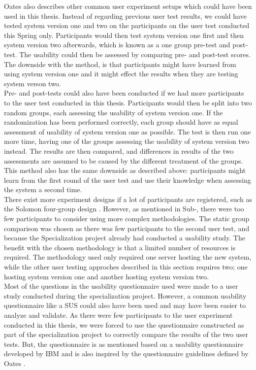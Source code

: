Oates also describes other common user experiment setups which could have been used in this thesis. Instead of regarding previous user test results, we could have tested system version one and two on the participants on the user test conducted this Spring only. Participants would then test system version one first and then system version two afterwards, which is known as a one group pre-test and post-test. The usability could then be assessed by comparing pre- and post-test scores. The downside with the method, is that participants might have learned from using system version one and it might effect the results when they are testing system verson two. \\

Pre- and post-tests could also have been conducted if we had more participants to the user test conducted in this thesis. Participants would then be split into two random groups, each assessing the usability of system version one. If the randomization has been performed correctly, each group should have as equal assessment of usability of system version one as possible. The test is then run one more time, having one of the groups assessing the usability of system version two instead. The results are then compared, and differences in results of the two assessments are assumed to be caused by the different treatment of the groups. This method also has the same downside as described above: participants might learn from the first round of the user test and use their knowledge when assessing the system a second time. \\

There exist more experiment designs if a lot of participants are registered, such as the Solomon four-group design \cite{Oates2006}. However, as mentioned in Sub-, there were too few participants to consider using more complex methodologies. The static group comparison was chosen as there was few participants to the second user test, and because the Specialization project already had conducted a usability study. The benefit with the chosen methodology is that a limited number of resources is required. The methodology used only required one server hosting the new system, while the other user testing approches described in this section requires two; one hosting system version one and another hosting system version two. \\

Most of the questions in the usability questionnaire used were made to a user study conducted during the specialization project. However, a common usability questionnaire like a SUS \cite{brooke1996} could also have been used and may have been easier to analyze and validate. As there were few participants to the user experiment conducted in this thesis, we were forced to use the questionnaire constructed as part of the specialization project to correctly compare the results of the two user tests. But, the questionnaire is as mentioned based on a usability questionnaire developed by IBM and is also inspired by the questionnaire guidelines defined by Oates \cite{Oates2006}. \\


